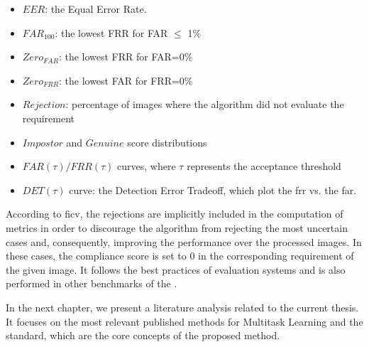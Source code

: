 \begin{itemize}
\item $EER$: the Equal Error Rate.
\item $FAR_{100}$: the lowest FRR for FAR $\leq$ 1\% 
\item $Zero_{FAR}$: the lowest FRR for FAR=0\%
\item $Zero_{FRR}$: the lowest FAR for FRR=0\%
\item $Rejection$: percentage of images where the algorithm did not evaluate the requirement
\item $Impostor$ and $Genuine$ score distributions
\item $FAR(\tau) / FRR(\tau)$ curves, where $\tau$ represents the acceptance threshold
\item $DET(\tau)$ curve: the Detection Error Tradeoff, which plot the \acl{frr} vs. the \acl{far}.
\end{itemize}

According to \acs{ficv}, the rejections are implicitly included in the computation of metrics in order to discourage the algorithm from rejecting the most uncertain cases and, consequently, improving the performance over the processed images. In these cases, the compliance score is set to 0 in the corresponding requirement of the given image. It follows the best practices of evaluation systems and is also performed in other benchmarks of the \fvcongoing.

In the next chapter, we present a literature analysis related to the current thesis. It focuses on the most relevant published methods for Multitask Learning and the \icao standard, which are the core concepts of the proposed method.
